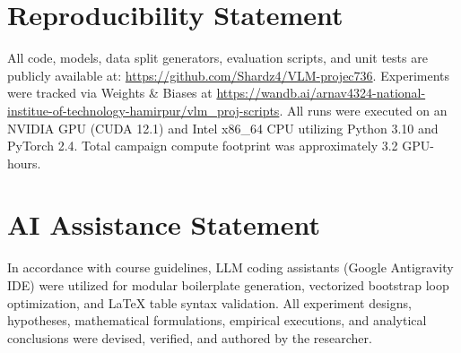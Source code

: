\documentclass[conference]{IEEEtran}
\begin{document}
\section*{Reproducibility Statement}
All code, models, data split generators, evaluation scripts, and unit tests are publicly available at: \url{https://github.com/Shardz4/VLM-projec736}. Experiments were tracked via Weights \& Biases at \url{https://wandb.ai/arnav4324-national-institue-of-technology-hamirpur/vlm_proj-scripts}. All runs were executed on an NVIDIA GPU (CUDA 12.1) and Intel x86\_64 CPU utilizing Python 3.10 and PyTorch 2.4. Total campaign compute footprint was approximately 3.2 GPU-hours.

\section*{AI Assistance Statement}
In accordance with course guidelines, LLM coding assistants (Google Antigravity IDE) were utilized for modular boilerplate generation, vectorized bootstrap loop optimization, and LaTeX table syntax validation. All experiment designs, hypotheses, mathematical formulations, empirical executions, and analytical conclusions were devised, verified, and authored by the researcher.



\end{document}
